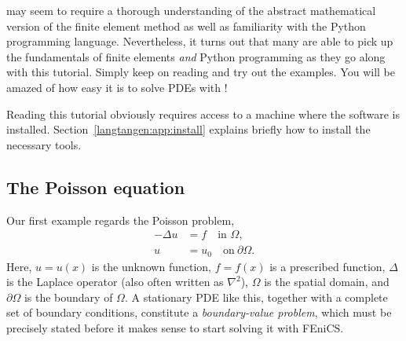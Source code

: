 \fenics{} may seem to require a thorough understanding of the abstract
mathematical version of the finite element method as well as familiarity
with the Python programming language.  Nevertheless, it turns out that
many are able to pick up the fundamentals of finite elements \emph{and}
Python programming as they go along with this tutorial. Simply keep on
reading and try out the examples. You will be amazed of how easy it is
to solve PDEs with \fenics{}!


Reading this tutorial obviously requires access to a machine where the
\fenics{} software is installed. Section~\ref{langtangen:app:install}
explains briefly how to install the necessary tools.

\subsection{The Poisson equation}
\label{langtangen:poisson1:bvp}

Our first example regards the Poisson problem,
\begin{equation} \label{langtangen:poisson1}
  \begin{split}
    - \Delta u &= f \quad \mbox{in } \Omega,
    \\
    u &= u_0 \quad \mbox{on} \  \partial \Omega.
  \end{split}
\end{equation}
Here, $u = u(x)$ is the unknown function, $f =
f(x)$ is a prescribed function, $\Delta$ is the Laplace
operator (also often written as $\nabla^2$), $\Omega$ is the spatial
domain, and $\partial\Omega$ is the boundary of $\Omega$. A stationary
PDE like this, together with a complete set of boundary conditions,
constitute a \emph{boundary-value problem}, which must be precisely
stated before it makes sense to start solving it with FEniCS.

